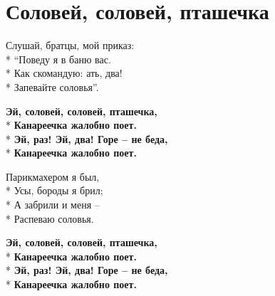 \vspace{\fill}\newpage

\section{Соловей, соловей, пташечка}
\label{song:Соловей,_соловей,_пташечка}

\medskip

\begin{minipage}{\linewidth}
Слушай, братцы, мой приказ:\\*
“Поведу я в баню вас.\\*
Как скомандую: ать, два!\\*
Запевайте соловья”.\\
\end{minipage}\par\medskip\nobreak

\medskip

\begin{minipage}{\linewidth}
\textbf{Эй, соловей, соловей, пташечка,}\\*
\textbf{Канареечка жалобно поет.}\\*
\textbf{Эй, раз! Эй, два! Горе – не беда,}\\*
\textbf{Канареечка жалобно поет.}\\
\end{minipage}\par\medskip\nobreak

\medskip

\begin{minipage}{\linewidth}
Парикмахером я был,\\*
Усы, бороды я брил;\\*
А забрили и меня –\\*
Распеваю соловья.\\
\end{minipage}\par\medskip\nobreak

\medskip

\begin{minipage}{\linewidth}
\textbf{Эй, соловей, соловей, пташечка,}\\*
\textbf{Канареечка жалобно поет.}\\*
\textbf{Эй, раз! Эй, два! Горе – не беда,}\\*
\textbf{Канареечка жалобно поет.}\\
\end{minipage}\par\medskip\nobreak

